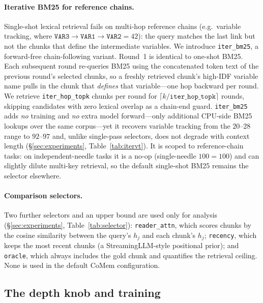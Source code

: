 \paragraph{Iterative BM25 for reference chains.} Single-shot lexical retrieval
fails on multi-hop reference chains (e.g.\ variable tracking, where
$\texttt{VAR3}\!\to\!\texttt{VAR1}\!\to\!\texttt{VAR2}{=}42$): the query
matches the last link but not the chunks that define the intermediate
variables. We introduce \texttt{iter\_bm25}, a forward-free chain-following
variant. Round~1 is identical to one-shot BM25. Each subsequent round
re-queries BM25 using the concatenated token text of the previous round's
selected chunks, so a freshly retrieved chunk's high-IDF variable name pulls in
the chunk that \emph{defines} that variable---one hop backward per round. We
retrieve \texttt{iter\_hop\_topk} chunks per round for
$\lceil k/\texttt{iter\_hop\_topk}\rceil$ rounds, skipping candidates with zero
lexical overlap as a chain-end guard. \texttt{iter\_bm25} adds \emph{no}
training and \emph{no} extra model forward---only additional CPU-side BM25
lookups over the same corpus---yet it recovers variable tracking from the
$20$--$28$ range to $92$--$97$ and, unlike single-pass selectors, does not
degrade with context length (\S\ref{sec:experiments},
Table~\ref{tab:itervt}). It is scoped to reference-chain tasks: on
independent-needle tasks it is a no-op (single-needle $100{=}100$) and can
slightly dilute multi-key retrieval, so the default single-shot BM25 remains the
selector elsewhere.

\paragraph{Comparison selectors.} Two further selectors and an upper bound are
used only for analysis (\S\ref{sec:experiments}, Table~\ref{tab:selector}):
\texttt{reader\_attn}, which scores chunks by the cosine similarity between the
query's $h_j$ and each chunk's $h_j$; \texttt{recency}, which keeps the most
recent chunks (a StreamingLLM-style positional prior); and \texttt{oracle},
which always includes the gold chunk and quantifies the retrieval ceiling. None
is used in the default CoMem configuration.

\subsection{The depth knob and training}
\label{subsec:jknob}

